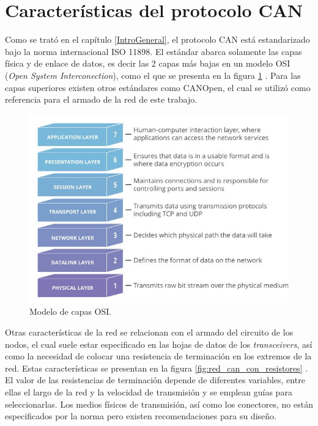 \section{Características del protocolo CAN}
\label{caracteristicas_can}

Como se trató en el capítulo \ref{IntroGeneral}, el protocolo CAN está estandarizado bajo la norma internacional ISO 11898\citep{web_ISO_CAN}. El estándar abarca solamente las capas física y de enlace de datos, es decir las 2 capas más bajas en un modelo OSI (\textit{Open System Interconection}), como el que se presenta en la figura \ref{fig:modeloOsi} \citep{web_modelo_osi}. Para las capas superiores existen otros estándares como CANOpen\citep{web_canopen}, el cual se utilizó como referencia para el armado de la red de este trabajo.

\begin{figure}[h!]
	\centering
	\includegraphics[scale=.7]{./Figures/OSI_model.JPG}
	\caption{Modelo de capas OSI\protect\footnotemark .}
	\label{fig:modeloOsi}
\end{figure}


Otras características de la red se relacionan con el armado del circuito de los nodos, el cual suele estar especificado en las hojas de datos de los \textit{transceivers}, así como la necesidad de colocar una resistencia de terminación en los extremos de la red. Estas características se presentan en la figura \ref{fig:red_can_con_resistores} \citep{web_can_bus_arduino}. El valor de las resistencias de terminación depende de diferentes variables, entre ellas el largo de la red y la velocidad de transmisión y se emplean guías para seleccionarlas. Los medios físicos de transmisión, así como los conectores, no están especificados por la norma pero existen recomendaciones para su diseño\citep{Embedded_Networking_CAN}.

